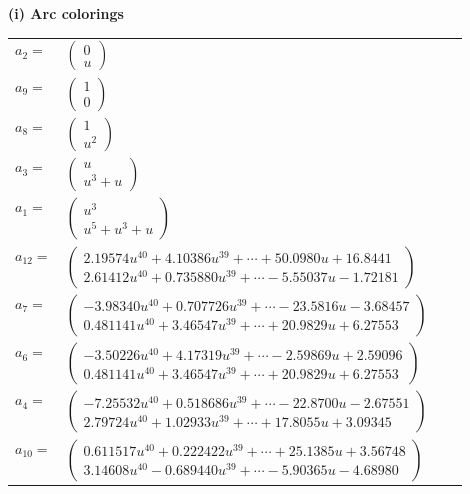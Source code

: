 \documentclass[1p]{elsarticle_modified}
\theoremstyle{definition}
\begin{document}
\flushleft \textbf{(i) Arc colorings}\\
\begin{tabular}{m{7pt} m{180pt} m{7pt} m{180pt} }
\flushright $a_{2}=$&$\begin{pmatrix}0\\u\end{pmatrix}$ \\
\flushright $a_{9}=$&$\begin{pmatrix}1\\0\end{pmatrix}$ \\
\flushright $a_{8}=$&$\begin{pmatrix}1\\u^2\end{pmatrix}$ \\
\flushright $a_{3}=$&$\begin{pmatrix}u\\u^3+u\end{pmatrix}$ \\
\flushright $a_{1}=$&$\begin{pmatrix}u^3\\u^5+u^3+u\end{pmatrix}$ \\
\flushright $a_{12}=$&$\begin{pmatrix}2.19574 u^{40}+4.10386 u^{39}+\cdots+50.0980 u+16.8441\\2.61412 u^{40}+0.735880 u^{39}+\cdots-5.55037 u-1.72181\end{pmatrix}$ \\
\flushright $a_{7}=$&$\begin{pmatrix}-3.98340 u^{40}+0.707726 u^{39}+\cdots-23.5816 u-3.68457\\0.481141 u^{40}+3.46547 u^{39}+\cdots+20.9829 u+6.27553\end{pmatrix}$ \\
\flushright $a_{6}=$&$\begin{pmatrix}-3.50226 u^{40}+4.17319 u^{39}+\cdots-2.59869 u+2.59096\\0.481141 u^{40}+3.46547 u^{39}+\cdots+20.9829 u+6.27553\end{pmatrix}$ \\
\flushright $a_{4}=$&$\begin{pmatrix}-7.25532 u^{40}+0.518686 u^{39}+\cdots-22.8700 u-2.67551\\2.79724 u^{40}+1.02933 u^{39}+\cdots+17.8055 u+3.09345\end{pmatrix}$ \\
\flushright $a_{10}=$&$\begin{pmatrix}0.611517 u^{40}+0.222422 u^{39}+\cdots+25.1385 u+3.56748\\3.14608 u^{40}-0.689440 u^{39}+\cdots-5.90365 u-4.68980\end{pmatrix}$ \\

\end{tabular}
\end{document}
